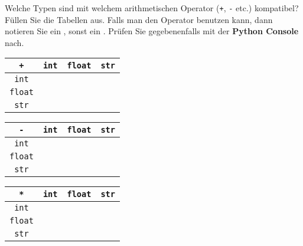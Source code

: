 Welche Typen sind mit welchem arithmetischen Operator (\lstinline{+}, \lstinline{-} etc.) kompatibel? Füllen Sie die Tabellen aus. Falls man den Operator benutzen kann, dann notieren Sie ein \cmark, sonst ein \xmark. Prüfen Sie gegebenenfalls mit der \textbf{Python Console} nach.

\begin{table}[htb]
\centering
\begin{minipage}{0.325\textwidth}
\centering
\begin{tabular}{|c|c|c|c|}
\hline
\lstinline$+$     & \lstinline$int$  & \lstinline$float$  & \lstinline$str$  \\ \hline
\lstinline$int$    &     &       &     \\ \hline
\lstinline$float$  &     &       &     \\ \hline
\lstinline$str$    &     &       &     \\ \hline
\end{tabular}
\end{minipage}
\hfill
\begin{minipage}{0.325\textwidth}
\centering
\begin{tabular}{|c|c|c|c|}
\hline
\lstinline$-$     & \lstinline$int$  & \lstinline$float$  & \lstinline$str$  \\ \hline
\lstinline$int$    &     &       &     \\ \hline
\lstinline$float$  &     &       &     \\ \hline
\lstinline$str$    &     &       &     \\ \hline
\end{tabular}
\end{minipage}
\hfill
\begin{minipage}{0.325\textwidth}
\centering
\begin{tabular}{|c|c|c|c|}
\hline
\lstinline$*$     & \lstinline$int$  & \lstinline$float$  & \lstinline$str$  \\ \hline
\lstinline$int$    &     &       &     \\ \hline
\lstinline$float$  &     &       &     \\ \hline
\lstinline$str$    &     &       &     \\ \hline
\end{tabular}
\end{minipage}
\end{table}

